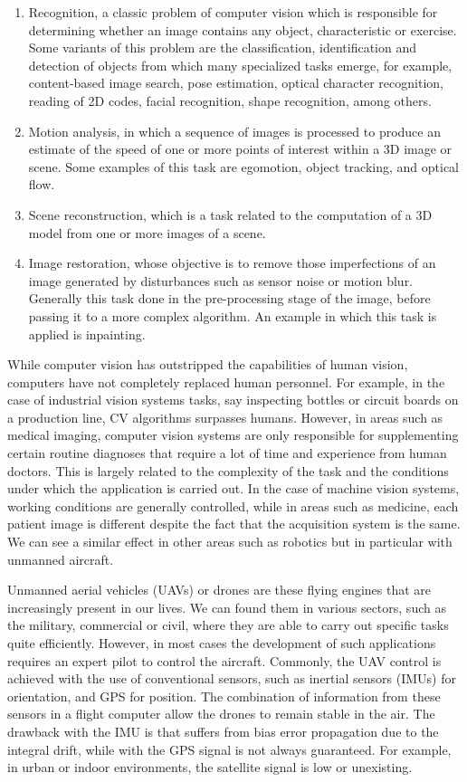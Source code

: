 \begin{enumerate}[label=\roman*]
	\item Recognition, a classic problem of computer vision which is responsible for determining whether an image contains any object, characteristic or exercise. Some variants of this problem are the classification, identification and detection of objects from which many specialized tasks emerge, for example, content-based image search, pose estimation, optical character recognition, reading of 2D codes, facial recognition, shape recognition, among others.
	\item Motion analysis, in which a sequence of images is processed to produce an estimate of the speed of one or more points of interest within a 3D image or scene. Some examples of this task are egomotion, object tracking, and optical flow.
	\item Scene reconstruction, which is a task related to the computation of a 3D model from one or more images of a scene.
	\item Image restoration, whose objective is to remove those imperfections of an image generated by disturbances such as sensor noise or motion blur. Generally this task done in the pre-processing stage of the image, before passing it to a more complex algorithm. An example in which this task is applied is inpainting.
\end{enumerate}

While computer vision has outstripped the capabilities of human vision, computers have not completely replaced human personnel. For example, in the case of industrial vision systems tasks, say inspecting bottles or circuit boards on a production line, CV algorithms surpasses humans. However, in areas such as medical imaging, computer vision systems are only responsible for supplementing certain routine diagnoses that require a lot of time and experience from human doctors. This is largely related to the complexity of the task and the conditions under which the application is carried out. In the case of machine vision systems, working conditions are generally controlled, while in areas such as medicine, each patient image is different despite the fact that the acquisition system is the same. We can see a similar effect in other areas such as robotics but in particular with unmanned aircraft.

Unmanned aerial vehicles (UAVs) or drones are these flying engines that are increasingly present in our lives. We can found them in various sectors, such as the military, commercial or civil, where they are able to carry out specific tasks quite efficiently. However, in most cases the development of such applications requires an expert pilot to control the aircraft. Commonly, the UAV  control is achieved with the use of conventional sensors, such as inertial sensors (IMUs) for orientation, and GPS for position. The combination of information from these sensors in a flight computer allow the drones to remain stable in the air. The drawback with the IMU is that suffers from bias error propagation due to the integral drift, while with the GPS signal is not always guaranteed. For example, in urban or indoor environments, the satellite signal is low or unexisting. 


